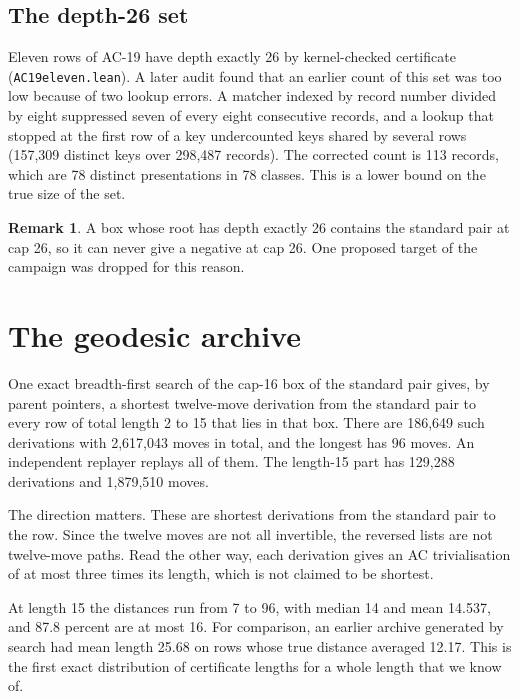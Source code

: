 \documentclass[11pt,a4paper]{article}
\theoremstyle{definition}
\newtheorem{remark}[theorem]{Remark}
\begin{document}
\subsection{The depth-26 set}

Eleven rows of AC-19 have depth exactly 26 by kernel-checked certificate (\texttt{AC19eleven.lean}). A later audit found that an earlier count of this set was too low because of two lookup errors. A matcher indexed by record number divided by eight suppressed seven of every eight consecutive records, and a lookup that stopped at the first row of a key undercounted keys shared by several rows (157,309 distinct keys over 298,487 records). The corrected count is 113 records, which are 78 distinct presentations in 78 classes. This is a lower bound on the true size of the set.

\begin{remark}
A box whose root has depth exactly 26 contains the standard pair at cap 26, so it can never give a negative at cap 26. One proposed target of the campaign was dropped for this reason.
\end{remark}

\section{The geodesic archive}\label{sec:geodesic}

One exact breadth-first search of the cap-16 box of the standard pair gives, by parent pointers, a shortest twelve-move derivation from the standard pair to every row of total length 2 to 15 that lies in that box. There are 186,649 such derivations with 2,617,043 moves in total, and the longest has 96 moves. An independent replayer replays all of them. The length-15 part has 129,288 derivations and 1,879,510 moves.

The direction matters. These are shortest derivations from the standard pair to the row. Since the twelve moves are not all invertible, the reversed lists are not twelve-move paths. Read the other way, each derivation gives an AC trivialisation of at most three times its length, which is not claimed to be shortest.

At length 15 the distances run from 7 to 96, with median 14 and mean 14.537, and 87.8 percent are at most 16. For comparison, an earlier archive generated by search had mean length 25.68 on rows whose true distance averaged 12.17. This is the first exact distribution of certificate lengths for a whole length that we know of.
\end{document}
